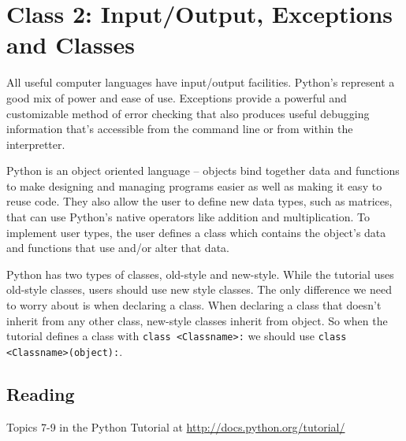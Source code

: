 \documentclass{report}
\begin{document}
\section{Class 2: Input/Output, Exceptions and Classes}
All useful computer languages have input/output facilities. Python's represent a good mix of power and ease of use. Exceptions provide a powerful and customizable method of error checking that also produces useful debugging information that's accessible from the command line or from within the interpretter.

Python is an object oriented language -- objects bind together data and functions to make designing and managing programs easier as well as making it easy to reuse code. They also allow the user to define new data types, such as matrices, that can use Python's native operators like addition and multiplication. To implement user types, the user defines a \gls{class} which contains the object's data and functions that use and/or alter that data.

Python has two types of classes, old-style and new-style. While the tutorial uses old-style classes, users should use new style classes. The only difference we need to worry about is when declaring a class. When declaring a class that doesn't inherit from any other class, new-style classes inherit from object. So when the tutorial defines a class with \verb|class <Classname>:| we should use \verb|class <Classname>(object):|.

\subsection{Reading}
Topics 7-9 in the Python Tutorial at \url{http://docs.python.org/tutorial/} \cite{website:Python272docs}
\end{document}
